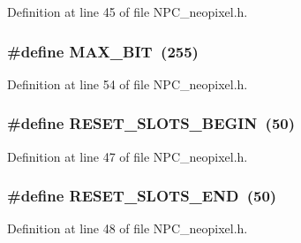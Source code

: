 Definition at line 45 of file N\+P\+C\+\_\+neopixel.\+h.

\subsubsection[{\texorpdfstring{M\+A\+X\+\_\+8\+B\+IT}{MAX_8BIT}}]{\setlength{\rightskip}{0pt plus 5cm}\#define M\+A\+X\+\_\+B\+IT~(255)}\hypertarget{group___constant_gaaf645a2813f2274619a70855afb92aca}{}\label{group___constant_gaaf645a2813f2274619a70855afb92aca}


Definition at line 54 of file N\+P\+C\+\_\+neopixel.\+h.

\subsubsection[{\texorpdfstring{R\+E\+S\+E\+T\+\_\+\+S\+L\+O\+T\+S\+\_\+\+B\+E\+G\+IN}{RESET_SLOTS_BEGIN}}]{\setlength{\rightskip}{0pt plus 5cm}\#define R\+E\+S\+E\+T\+\_\+\+S\+L\+O\+T\+S\+\_\+\+B\+E\+G\+IN~(50)}\hypertarget{group___constant_ga38b56d14857b32e86b876a32957a2b63}{}\label{group___constant_ga38b56d14857b32e86b876a32957a2b63}


Definition at line 47 of file N\+P\+C\+\_\+neopixel.\+h.

\subsubsection[{\texorpdfstring{R\+E\+S\+E\+T\+\_\+\+S\+L\+O\+T\+S\+\_\+\+E\+ND}{RESET_SLOTS_END}}]{\setlength{\rightskip}{0pt plus 5cm}\#define R\+E\+S\+E\+T\+\_\+\+S\+L\+O\+T\+S\+\_\+\+E\+ND~(50)}\hypertarget{group___constant_ga91e46b7f75ff75a4719a9d7f589df5a3}{}\label{group___constant_ga91e46b7f75ff75a4719a9d7f589df5a3}


Definition at line 48 of file N\+P\+C\+\_\+neopixel.\+h.

